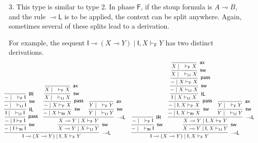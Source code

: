 \documentclass[copyright,creativecommons]{eptcs}
\theoremstyle{definition}
\newcommand{\lleft}{{\multimap}\mathsf{L}}
\newcommand{\pass}{\mathsf{pass}}
\newcommand{\unitl}{\mathsf{IL}}
\newcommand{\unitr}{\mathsf{IR}}
\newcommand{\ax}{\mathsf{ax}}
\newcommand{\lolli}{\multimap}
\newcommand{\I}{\mathsf{I}}
\newcommand{\RI}{\mathsf{RI}}
\newcommand{\LI}{\mathsf{LI}}
\newcommand{\Pass}{\mathsf{P}}
\newcommand{\F}{\mathsf{F}}
\begin{document}
\begin{enumerate}
\item[3.] This type is similar to type 2. In phase $\F$, if the stoup formula is $A \lolli B$, and the rule $\lleft$ is to be applied, the context can be split anywhere. Again, sometimes several of these splits lead to a derivation.

 For example, the sequent $\I \lolli (X \lolli Y) \mid \I , X \vdash_{\F} Y$ has two distinct derivations.
\begin{equation*}
\small
\hspace*{-5mm}
  \begin{array}{cc}
    \infer[\lleft]{\I \lolli (X \lolli Y) \mid \I , X \vdash_{\F} Y}{
      \infer[\mathsf{sw}]{{-} \mid \I \vdash_{\RI} \I}{
        \infer[\pass]{{-} \mid \I \vdash_{\Pass} \I}{
          \infer[\unitl]{\I \mid \quad \vdash_{\LI} \I}{
            \infer[\mathsf{sw}]{{-} \mid \quad \vdash_{\LI} \I}{
              \infer[\unitr]{{-} \mid \quad \vdash_{\F} \I}{}
            }
          }
        }
      }
      &
      \infer[\mathsf{sw}]{X \lolli Y \mid X \vdash_{\LI} Y}{
        \infer[\lleft]{X \lolli Y \mid X \vdash_{\F} Y}{
          \infer[\mathsf{sw}]{{-} \mid X \vdash_{\RI} X}{
            \infer[\pass]{{-} \mid X \vdash_{\Pass} X}{
              \infer[\mathsf{sw}]{X \mid \quad \vdash_{\LI} X}{
                \infer[\ax]{X \mid \quad \vdash_{\F} X}{}
              }
            }
          }
          &
          \infer[\mathsf{sw}]{Y \mid \quad \vdash_{\LI} Y}{
            \infer[\ax]{Y \mid \quad \vdash_{\F} Y}{}
          }
        }
      }
    }
    &
    \infer[\lleft]{\I \lolli (X \lolli Y) \mid \I , X \vdash_{\F} Y}{
      \infer[\mathsf{sw}]{{-} \mid \quad \vdash_{\RI} \I}{
        \infer[\unitr]{{-} \mid \quad \vdash_{\F} \I}{}
      }
      &
      \infer[\mathsf{sw}]{X \lolli Y \mid \I , X \vdash_{\LI} Y}{
        \infer[\lleft]{X \lolli Y \mid \I , X \vdash_{\F} Y}{
          \infer[\mathsf{sw}]{{-} \mid \I , X \vdash_{\RI} X}{
            \infer[\pass]{{-} \mid \I , X \vdash_{\Pass} X}{
              \infer[\unitl]{\I \mid X \vdash_{\LI} X}{
                \infer[\mathsf{sw}]{{-} \mid X \vdash_{\LI} X}{
                  \infer[\pass]{{-} \mid X \vdash_{\Pass} X}{
                    \infer[\mathsf{sw}]{X \mid \quad \vdash_{\LI} X}{
                      \infer[\ax]{X \mid \quad \vdash_{\F} X}{}
                    }
                  }
                }
              }
            }
          }
          &
          \infer[\mathsf{sw}]{Y \mid \quad \vdash_{\LI} Y}{
            \infer[\ax]{Y \mid \quad \vdash_{\F} Y}{}
}}}}
\end{array}
\end{equation*}
\end{enumerate}
\end{document}
